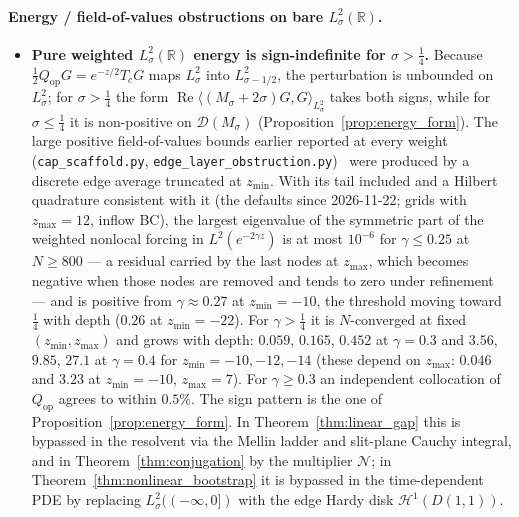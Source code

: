 \documentclass[11pt,a4paper]{article}
\begin{document}
\paragraph{Energy / field-of-values obstructions on bare $L^2_\sigma(\mathbb{R})$.}
\begin{itemize}
\item \textbf{Pure weighted $L^2_\sigma(\mathbb{R})$ energy is sign-indefinite for $\sigma>\tfrac14$.}
  Because $\tfrac12 Q_{\mathrm{op}}G=e^{-z/2}T_c G$ maps $L^2_\sigma$ into
  $L^2_{\sigma-1/2}$, the perturbation is unbounded on $L^2_\sigma$; for $\sigma>\tfrac14$ the form
  $\operatorname{Re}\langle(M_\sigma+2\sigma)G,G\rangle_{L^2_\sigma}$ takes both signs, while for $\sigma\le\tfrac14$ it is
  non-positive on $\mathcal{D}(M_\sigma)$ (Proposition~\ref{prop:energy_form}).  The large positive field-of-values bounds earlier reported at every weight
  (\texttt{cap\_scaffold.py}, \texttt{edge\_layer\_obstruction.py})~\cite{findings_edge_layer,findings_cap} were produced by a
  discrete edge average truncated at $z_{\min}$.  With its tail included and a Hilbert quadrature consistent with it (the defaults since 2026-11-22;
  grids with $z_{\max}=12$, inflow BC), the largest eigenvalue of the symmetric part of the weighted nonlocal forcing in
  $L^2(e^{-2\gamma z})$ is at most $10^{-6}$ for $\gamma\le0.25$ at $N\ge800$ --- a residual carried by the last nodes at
  $z_{\max}$, which becomes negative when those nodes are removed and tends to zero under refinement --- and is positive from
  $\gamma\approx0.27$ at $z_{\min}=-10$, the threshold moving toward $\tfrac14$ with depth ($0.26$ at $z_{\min}=-22$).  For
  $\gamma>\tfrac14$ it is $N$-converged at fixed $(z_{\min},z_{\max})$ and grows with depth: $0.059$, $0.165$, $0.452$ at $\gamma=0.3$
  and $3.56$, $9.85$, $27.1$ at $\gamma=0.4$ for $z_{\min}=-10,-12,-14$ (these depend on $z_{\max}$: $0.046$ and $3.23$ at
  $z_{\min}=-10$, $z_{\max}=7$).  For $\gamma\ge0.3$ an independent collocation of $Q_{\mathrm{op}}$ agrees to within $0.5\%$.
  The sign pattern is the one of Proposition~\ref{prop:energy_form}.
  In Theorem~\ref{thm:linear_gap} this is bypassed in the resolvent via the Mellin ladder and
  slit-plane Cauchy integral, and in Theorem~\ref{thm:conjugation} by the multiplier $\mathcal{N}$; in Theorem~\ref{thm:nonlinear_bootstrap} it is bypassed in the
  time-dependent PDE by replacing $L^2_\sigma((-\infty,0])$ with the edge Hardy disk $\mathcal{H}^1(D(1,1))$.
\end{itemize}
\end{document}
